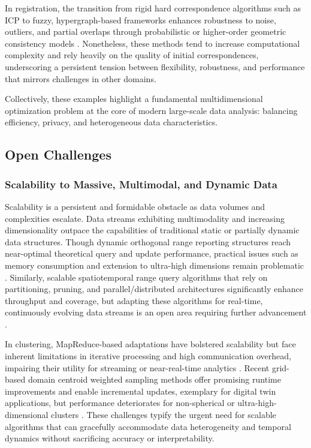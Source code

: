 \documentclass[11pt]{article}
\begin{document}
In registration, the transition from rigid hard correspondence algorithms such as ICP to fuzzy, hypergraph-based frameworks enhances robustness to noise, outliers, and partial overlaps through probabilistic or higher-order geometric consistency models \cite{ref5, ref6}. Nonetheless, these methods tend to increase computational complexity and rely heavily on the quality of initial correspondences, underscoring a persistent tension between flexibility, robustness, and performance that mirrors challenges in other domains.

Collectively, these examples highlight a fundamental multidimensional optimization problem at the core of modern large-scale data analysis: balancing efficiency, privacy, and heterogeneous data characteristics.

\subsection{Open Challenges}

\subsubsection{Scalability to Massive, Multimodal, and Dynamic Data}

Scalability is a persistent and formidable obstacle as data volumes and complexities escalate. Data streams exhibiting multimodality and increasing dimensionality outpace the capabilities of traditional static or partially dynamic data structures. Though dynamic orthogonal range reporting structures reach near-optimal theoretical query and update performance, practical issues such as memory consumption and extension to ultra-high dimensions remain problematic \cite{ref3}. Similarly, scalable spatiotemporal range query algorithms that rely on partitioning, pruning, and parallel/distributed architectures significantly enhance throughput and coverage, but adapting these algorithms for real-time, continuously evolving data streams is an open area requiring further advancement \cite{ref7}.

In clustering, MapReduce-based adaptations have bolstered scalability but face inherent limitations in iterative processing and high communication overhead, impairing their utility for streaming or near-real-time analytics \cite{ref22}. Recent grid-based domain centroid weighted sampling methods offer promising runtime improvements and enable incremental updates, exemplary for digital twin applications, but performance deteriorates for non-spherical or ultra-high-dimensional clusters \cite{ref26}. These challenges typify the urgent need for scalable algorithms that can gracefully accommodate data heterogeneity and temporal dynamics without sacrificing accuracy or interpretability.
\end{document}
